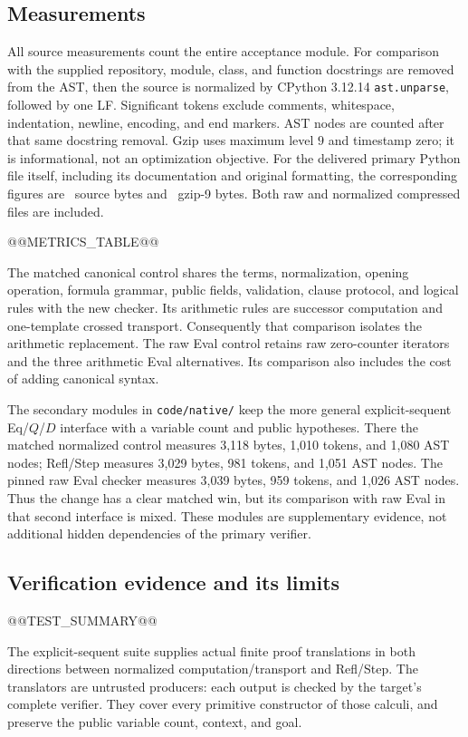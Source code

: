 \subsection{Measurements}

All source measurements count the entire acceptance module.
For comparison with the supplied repository, module, class, and
function docstrings are removed from the AST, then the source is
normalized by CPython 3.12.14 \texttt{ast.unparse}, followed by one LF.
Significant tokens exclude comments, whitespace, indentation, newline,
encoding, and end markers. AST nodes are counted after that same
docstring removal. Gzip uses maximum level \(9\) and timestamp zero;
it is informational, not an optimization objective.
For the delivered primary Python file itself, including its documentation
and original formatting, the corresponding figures are
\StepSourceBytes\ source bytes and \StepSourceGzip\ gzip-9 bytes.
Both raw and normalized compressed files are included.

@@METRICS_TABLE@@

The matched canonical control shares the terms, normalization,
opening operation, formula grammar, public fields, validation, clause
protocol, and logical rules with the new checker. Its arithmetic rules
are successor computation and one-template crossed transport.
Consequently that comparison isolates the arithmetic replacement.
The raw Eval control retains raw zero-counter iterators and the three
arithmetic Eval alternatives. Its comparison also includes the cost
of adding canonical syntax.

The secondary modules in \texttt{code/native/} keep the more general
explicit-sequent Eq/\(Q\)/\(D\) interface with a variable count and
public hypotheses. There the matched normalized control measures
3,118 bytes, 1,010 tokens, and 1,080 AST nodes; Refl/Step measures
3,029 bytes, 981 tokens, and 1,051 AST nodes. The pinned raw Eval
checker measures 3,039 bytes, 959 tokens, and 1,026 AST nodes.
Thus the change has a clear matched win, but its comparison with
raw Eval in that second interface is mixed. These modules are
supplementary evidence, not additional hidden dependencies of
the primary verifier.

\subsection{Verification evidence and its limits}

@@TEST_SUMMARY@@

The explicit-sequent suite supplies actual finite proof translations
in both directions between normalized computation/transport and
Refl/Step. The translators are untrusted producers: each output is
checked by the target's complete verifier. They cover every primitive
constructor of those calculi, and preserve the public variable count,
context, and goal.

